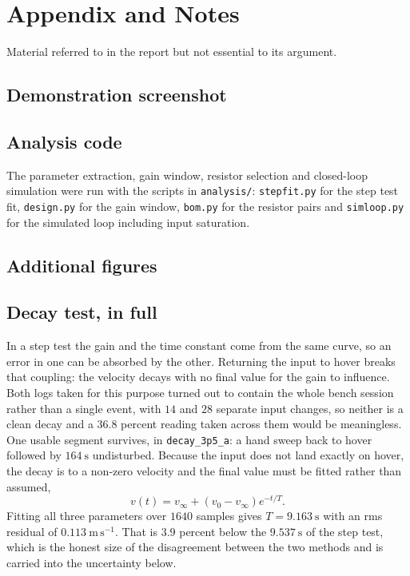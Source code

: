 \section{Appendix and Notes}\label{sec:appendix}
Material referred to in the report but not essential to its argument.

\subsection{Demonstration screenshot}

\subsection{Analysis code}
The parameter extraction, gain window, resistor selection and closed-loop simulation were run
with the scripts in \texttt{analysis/}: \texttt{stepfit.py} for the step test fit,
\texttt{design.py} for the gain window, \texttt{bom.py} for the resistor pairs and
\texttt{simloop.py} for the simulated loop including input saturation.

\subsection{Additional figures}

\subsection{Decay test, in full}
In a step test the gain and the time constant come from the same curve, so
an error in one can be absorbed by the other. Returning the input to hover breaks that coupling:
the velocity decays with no final value for the gain to influence. Both logs taken for this purpose
turned out to contain the whole bench session rather than a single event, with $14$ and $28$
separate input changes, so neither is a clean decay and a $36.8$ percent reading taken across them
would be meaningless. One usable segment survives, in \texttt{decay\_3p5\_a}: a hand sweep back to
hover followed by $164\ \mathrm{s}$ undisturbed. Because the input does not land exactly on hover,
the decay is to a non-zero velocity and the final value must be fitted rather than assumed,
\begin{equation}
    v(t) = v_\infty + \left(v_0 - v_\infty\right)e^{-t/T} .
\end{equation}
Fitting all three parameters over $1640$ samples gives $T = 9.163\ \mathrm{s}$ with an rms residual
of $0.113\ \mathrm{m\,s^{-1}}$. That is $3.9$ percent below the $9.537\ \mathrm{s}$ of the step
test, which is the honest size of the disagreement between the two methods and is carried into the
uncertainty below.

